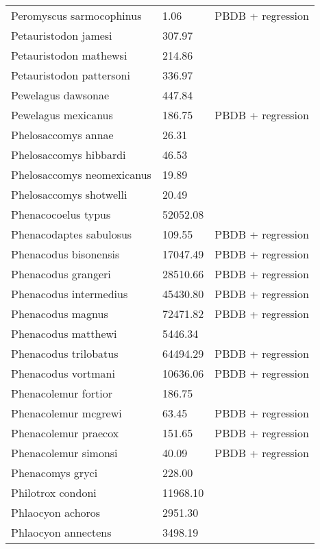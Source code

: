 \documentclass{article}
\begin{document}
\begin{center}
\begin{longtable}{p{} p{} p{}}
    Peromyscus sarmocophinus & 1.06 & PBDB + regression \\ 
    Petauristodon jamesi & 307.97 & \cite{Tomiya2013} \\ 
    Petauristodon mathewsi & 214.86 & \cite{Tomiya2013} \\ 
    Petauristodon pattersoni & 336.97 & \cite{Tomiya2013} \\ 
    Pewelagus dawsonae & 447.84 & \cite{Jepsen1932} \\ 
    Pewelagus mexicanus & 186.75 & PBDB + regression \\ 
    Phelosaccomys annae & 26.31 & \cite{Tomiya2013} \\ 
    Phelosaccomys hibbardi & 46.53 & \cite{Tomiya2013} \\ 
    Phelosaccomys neomexicanus & 19.89 & \cite{Tomiya2013} \\ 
    Phelosaccomys shotwelli & 20.49 & \cite{Tomiya2013} \\ 
    Phenacocoelus typus & 52052.08 & \cite{Tomiya2013} \\ 
    Phenacodaptes sabulosus & 109.55 & PBDB + regression \\ 
    Phenacodus bisonensis & 17047.49 & PBDB + regression \\ 
    Phenacodus grangeri & 28510.66 & PBDB + regression \\ 
    Phenacodus intermedius & 45430.80 & PBDB + regression \\ 
    Phenacodus magnus & 72471.82 & PBDB + regression \\ 
    Phenacodus matthewi & 5446.34 & \cite{Cope1871} \\ 
    Phenacodus trilobatus & 64494.29 & PBDB + regression \\ 
    Phenacodus vortmani & 10636.06 & PBDB + regression \\ 
    Phenacolemur fortior & 186.75 & \cite{Wood1962} \\ 
    Phenacolemur mcgrewi & 63.45 & PBDB + regression \\ 
    Phenacolemur praecox & 151.65 & PBDB + regression \\ 
    Phenacolemur simonsi & 40.09 & PBDB + regression \\ 
    Phenacomys gryci & 228.00 & \cite{McKenna2011} \\ 
    Philotrox condoni & 11968.10 & \cite{Tomiya2013} \\ 
    Phlaocyon achoros & 2951.30 & \cite{Tomiya2013} \\ 
    Phlaocyon annectens & 3498.19 & \cite{Tomiya2013} \\ 

\end{longtable}
\end{center}
\end{document}
